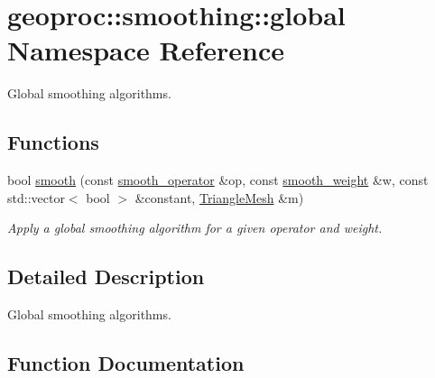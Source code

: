 \hypertarget{namespacegeoproc_1_1smoothing_1_1global}{}\section{geoproc\+:\+:smoothing\+:\+:global Namespace Reference}
\label{namespacegeoproc_1_1smoothing_1_1global}


Global smoothing algorithms.  


\subsection*{Functions}
\begin{DoxyCompactItemize}
\item 
bool \hyperlink{namespacegeoproc_1_1smoothing_1_1global_a7e294855e2c00be2b1141aa3f4e2650a}{smooth} (const \hyperlink{namespacegeoproc_1_1smoothing_a64c2bfd1dda6cfbf39afa2e61fd62537}{smooth\+\_\+operator} \&op, const \hyperlink{namespacegeoproc_1_1smoothing_a76e43f405426c150569712512de58028}{smooth\+\_\+weight} \&w, const std\+::vector$<$ bool $>$ \&constant, \hyperlink{classgeoproc_1_1TriangleMesh}{Triangle\+Mesh} \&m)
\begin{DoxyCompactList}\small\item\em Apply a global smoothing algorithm for a given operator and weight. \end{DoxyCompactList}\end{DoxyCompactItemize}


\subsection{Detailed Description}
Global smoothing algorithms. 

\subsection{Function Documentation}
\mbox{\label{namespacegeoproc_1_1smoothing_1_1global_a7e294855e2c00be2b1141aa3f4e2650a}} 
